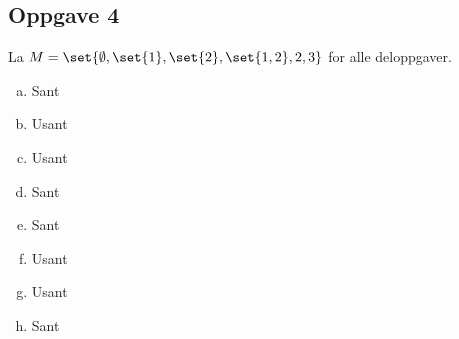 \documentclass{article}
\begin{document}
\subsection*{Oppgave 4}
La $M = \set{\emptyset, \set{1}, \set{2}, \set{1, 2}, 2, 3}$ for alle deloppgaver.
\begin{enumerate}[(a)]
    \item Sant
    \item Usant
    \item Usant
    \item Sant
    \item Sant
    \item Usant
    \item Usant
    \item Sant
\end{enumerate}
\end{document}
